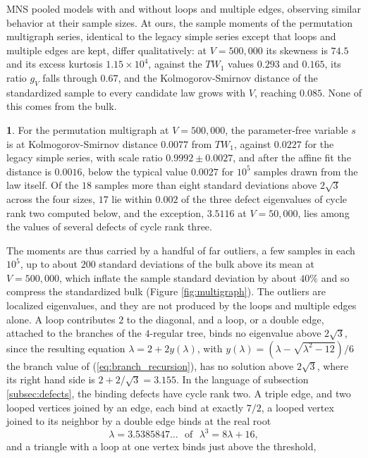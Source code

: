 \documentclass[12pt,oneside,english]{amsart}
\numberwithin{equation}{section}
\numberwithin{figure}{section}
\numberwithin{table}{section}
\theoremstyle{plain}
\numberwithin{thm}{section}
\theoremstyle{plain}
\theoremstyle{plain}
\theoremstyle{plain}
\theoremstyle{definition}
\theoremstyle{definition}
\newtheorem{numresult}[thm]{\protect\numresultname}
\theoremstyle{definition}
\theoremstyle{remark}
\providecommand{\numresultname}{Numerical Result}
\begin{document}
MNS pooled models with and without loops and multiple edges, observing
similar behavior at their sample sizes. At ours, the sample moments
of the permutation multigraph series, identical to the legacy simple
series except that loops and multiple edges are kept, differ qualitatively:
at $V=500{,}000$ its skewness is $74.5$ and its excess kurtosis
$1.15\times10^{4}$, against the $TW_{1}$ values $0.293$ and $0.165$,
its ratio $g_{V}$ falls through $0.67$, and the Kolmogorov-Smirnov
distance of the standardized sample to every candidate law grows with
$V$, reaching $0.085$. None of this comes from the bulk.
\begin{numresult}
\label{nr:multigraph}For the permutation multigraph at $V=500{,}000$,
the parameter-free variable $s$ is at Kolmogorov-Smirnov distance
$0.0077$ from $TW_{1}$, against $0.0227$ for the legacy simple series,
with scale ratio $0.9992\pm0.0027$, and after the affine fit the distance
is $0.0016$, below the typical value $0.0027$ for $10^{5}$ samples
drawn from the law itself. Of the $18$ samples more than eight standard
deviations above $2\sqrt{3}$ across the four sizes, $17$ lie within
$0.002$ of the three defect eigenvalues of cycle rank two computed
below, and the exception, $3.5116$ at $V=50{,}000$, lies among the
values of several defects of cycle rank three.
\end{numresult}
The moments are thus carried by a handful of far outliers, a few samples
in each $10^{5}$, up to about $200$ standard deviations of the bulk
above its mean at $V=500{,}000$, which inflate the sample standard
deviation by about $40\%$ and so compress the standardized bulk (Figure
\ref{fig:multigraph}). The outliers are localized eigenvalues, and
they are not produced by the loops and multiple edges alone. A loop
contributes $2$ to the diagonal, and a loop, or a double edge, attached
to the branches of the $4$-regular tree, binds no eigenvalue above
$2\sqrt{3}$, since the resulting equation $\lambda=2+2y(\lambda)$,
with $y(\lambda)=(\lambda-\sqrt{\lambda^{2}-12})/6$ the branch value
of (\ref{eq:branch_recursion}), has no solution above $2\sqrt{3}$,
where its right hand side is $2+2/\sqrt{3}=3.155$. In the language
of subsection \ref{subsec:defects}, the binding defects have cycle
rank two. A triple edge, and two looped vertices joined by an edge,
each bind at exactly $7/2$, a looped vertex joined to its neighbor
by a double edge binds at the real root
\[
\lambda=3.5385847\dots\ \ \ \text{of}\ \ \ \lambda^{3}=8\lambda+16,
\]
and a triangle with a loop at one vertex binds just above the threshold,
\end{document}
